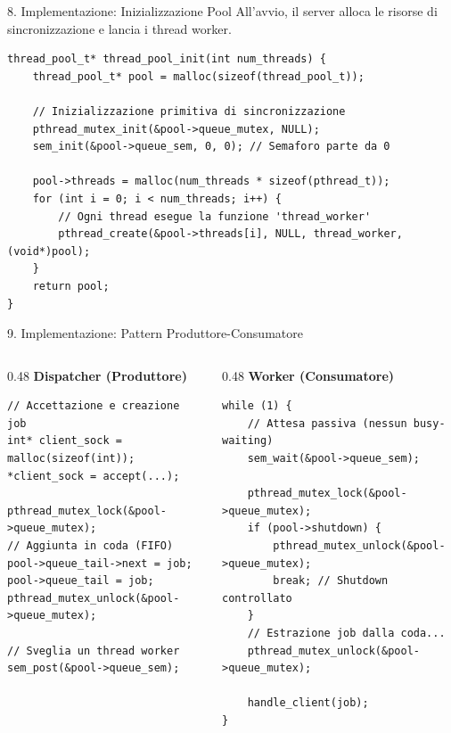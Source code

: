 \documentclass[aspectratio=169, 10pt]{beamer}
\begin{document}
\begin{frame}[fragile]{8. Implementazione: Inizializzazione Pool}
    All'avvio, il server alloca le risorse di sincronizzazione e lancia i thread worker.
    
\begin{lstlisting}[style=cstyle]
thread_pool_t* thread_pool_init(int num_threads) {
    thread_pool_t* pool = malloc(sizeof(thread_pool_t));
    
    // Inizializzazione primitiva di sincronizzazione
    pthread_mutex_init(&pool->queue_mutex, NULL);
    sem_init(&pool->queue_sem, 0, 0); // Semaforo parte da 0

    pool->threads = malloc(num_threads * sizeof(pthread_t));
    for (int i = 0; i < num_threads; i++) {
        // Ogni thread esegue la funzione 'thread_worker'
        pthread_create(&pool->threads[i], NULL, thread_worker, (void*)pool);
    }
    return pool;
}
\end{lstlisting}
\end{frame}

\begin{frame}[fragile]{9. Implementazione: Pattern Produttore-Consumatore}
    \begin{columns}
        \begin{column}{0.48\textwidth}
            \textbf{Dispatcher (Produttore)}
\begin{lstlisting}[style=cstyle]
// Accettazione e creazione job
int* client_sock = malloc(sizeof(int));
*client_sock = accept(...);

pthread_mutex_lock(&pool->queue_mutex);
// Aggiunta in coda (FIFO)
pool->queue_tail->next = job;
pool->queue_tail = job;
pthread_mutex_unlock(&pool->queue_mutex);

// Sveglia un thread worker
sem_post(&pool->queue_sem);
\end{lstlisting}
        \end{column}
        
        \begin{column}{0.48\textwidth}
            \textbf{Worker (Consumatore)}
\begin{lstlisting}[style=cstyle]
while (1) {
    // Attesa passiva (nessun busy-waiting)
    sem_wait(&pool->queue_sem);
    
    pthread_mutex_lock(&pool->queue_mutex);
    if (pool->shutdown) {
        pthread_mutex_unlock(&pool->queue_mutex);
        break; // Shutdown controllato
    }
    // Estrazione job dalla coda...
    pthread_mutex_unlock(&pool->queue_mutex);
    
    handle_client(job);
}
\end{lstlisting}
        \end{column}
    \end{columns}
\end{frame}
\end{document}
